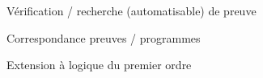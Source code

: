 \begin{frame}
	   
	  Vérification / recherche (automatisable) de preuve\newline\pause
	  
	  Correspondance preuves / programmes\newline\pause
	  
	  Extension à logique du premier ordre
	  
	  
	  

\end{frame}

